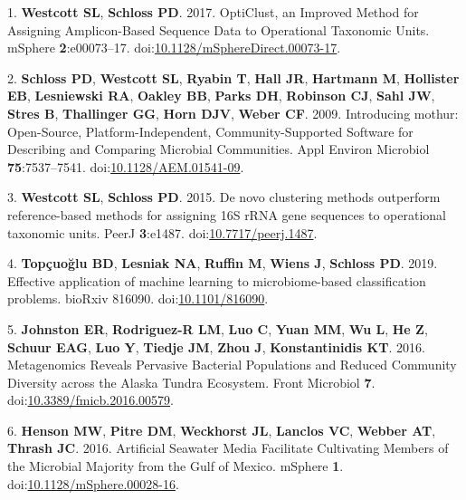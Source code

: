 \documentclass[
  11pt,
]{article}
\newenvironment{cslreferences}%
  {}%
  {\par}
\begin{document}
\hypertarget{refs}{}
\begin{cslreferences}
\leavevmode\hypertarget{ref-westcott_opticlust_2017}{}%
1. \textbf{Westcott SL}, \textbf{Schloss PD}. 2017. OptiClust, an
Improved Method for Assigning Amplicon-Based Sequence Data to
Operational Taxonomic Units. mSphere \textbf{2}:e00073--17.
doi:\href{https://doi.org/10.1128/mSphereDirect.00073-17}{10.1128/mSphereDirect.00073-17}.

\leavevmode\hypertarget{ref-schloss_introducing_2009}{}%
2. \textbf{Schloss PD}, \textbf{Westcott SL}, \textbf{Ryabin T},
\textbf{Hall JR}, \textbf{Hartmann M}, \textbf{Hollister EB},
\textbf{Lesniewski RA}, \textbf{Oakley BB}, \textbf{Parks DH},
\textbf{Robinson CJ}, \textbf{Sahl JW}, \textbf{Stres B},
\textbf{Thallinger GG}, \textbf{Horn DJV}, \textbf{Weber CF}. 2009.
Introducing mothur: Open-Source, Platform-Independent,
Community-Supported Software for Describing and Comparing Microbial
Communities. Appl Environ Microbiol \textbf{75}:7537--7541.
doi:\href{https://doi.org/10.1128/AEM.01541-09}{10.1128/AEM.01541-09}.

\leavevmode\hypertarget{ref-westcott_novo_2015}{}%
3. \textbf{Westcott SL}, \textbf{Schloss PD}. 2015. De novo clustering
methods outperform reference-based methods for assigning 16S rRNA gene
sequences to operational taxonomic units. PeerJ \textbf{3}:e1487.
doi:\href{https://doi.org/10.7717/peerj.1487}{10.7717/peerj.1487}.

\leavevmode\hypertarget{ref-topcuoglu_effective_2019}{}%
4. \textbf{Topçuoğlu BD}, \textbf{Lesniak NA}, \textbf{Ruffin M},
\textbf{Wiens J}, \textbf{Schloss PD}. 2019. Effective application of
machine learning to microbiome-based classification problems. bioRxiv
816090. doi:\href{https://doi.org/10.1101/816090}{10.1101/816090}.

\leavevmode\hypertarget{ref-johnston_metagenomics_2016}{}%
5. \textbf{Johnston ER}, \textbf{Rodriguez-R LM}, \textbf{Luo C},
\textbf{Yuan MM}, \textbf{Wu L}, \textbf{He Z}, \textbf{Schuur EAG},
\textbf{Luo Y}, \textbf{Tiedje JM}, \textbf{Zhou J},
\textbf{Konstantinidis KT}. 2016. Metagenomics Reveals Pervasive
Bacterial Populations and Reduced Community Diversity across the Alaska
Tundra Ecosystem. Front Microbiol \textbf{7}.
doi:\href{https://doi.org/10.3389/fmicb.2016.00579}{10.3389/fmicb.2016.00579}.

\leavevmode\hypertarget{ref-henson_artificial_2016}{}%
6. \textbf{Henson MW}, \textbf{Pitre DM}, \textbf{Weckhorst JL},
\textbf{Lanclos VC}, \textbf{Webber AT}, \textbf{Thrash JC}. 2016.
Artificial Seawater Media Facilitate Cultivating Members of the
Microbial Majority from the Gulf of Mexico. mSphere \textbf{1}.
doi:\href{https://doi.org/10.1128/mSphere.00028-16}{10.1128/mSphere.00028-16}.


\end{cslreferences}
\end{document}
